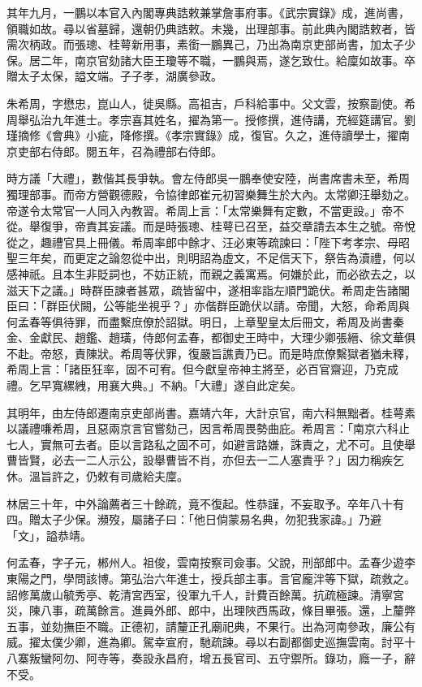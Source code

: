\begin{pinyinscope}
其年九月，一鵬以本官入內閣專典誥敕兼掌詹事府事。《武宗實錄》成，進尚書，領職如故。尋以省墓歸，還朝仍典誥敕。未幾，出理部事。前此典內閣誥敕者，皆需次柄政。而張璁、桂萼新用事，素銜一鵬異己，乃出為南京吏部尚書，加太子少保。居二年，南京官劾諸大臣王瓊等不職，一鵬與焉，遂乞致仕。給廩如故事。卒贈太子太保，謚文端。子子孝，湖廣參政。

朱希周，字懋忠，崑山人，徙吳縣。高祖吉，戶科給事中。父文雲，按察副使。希周舉弘治九年進士。孝宗喜其姓名，擢為第一。授修撰，進侍講，充經筵講官。劉瑾摘修《會典》小疵，降修撰。《孝宗實錄》成，復官。久之，進侍讀學士，擢南京吏部右侍郎。閱五年，召為禮部右侍郎。

時方議「大禮」，數偕其長爭執。會左侍郎吳一鵬奉使安陸，尚書席書未至，希周獨理部事。而帝方營觀德殿，令協律郎崔元初習樂舞生於大內。太常卿汪舉劾之。帝遂令太常官一人同入內教習。希周上言：「太常樂舞有定數，不當更設。」帝不從。舉復爭，帝責其妄議。而是時張璁、桂萼已召至，益交章請去本生之號。帝悅從之，趣禮官具上冊儀。希周率郎中餘才、汪必東等疏諫曰：「陛下考孝宗、母昭聖三年矣，而更定之論忽從中出，則明詔為虛文，不足信天下，祭告為瀆禮，何以感神祇。且本生非貶詞也，不妨正統，而親之義寓焉。何嫌於此，而必欲去之，以滋天下之議。」時群臣諫者甚眾，疏皆留中，遂相率詣左順門跪伏。希周走告諸閣臣曰：「群臣伏闕，公等能坐視乎？」亦偕群臣跪伏以請。帝聞，大怒，命希周與何孟春等俱待罪，而盡繫庶僚於詔獄。明日，上章聖皇太后冊文，希周及尚書秦金、金獻民、趙鑑、趙璜，侍郎何孟春，都御史王時中，大理少卿張縉、徐文華俱不赴。帝怒，責陳狀。希周等伏罪，復嚴旨譙責乃已。而是時庶僚繫獄者猶未釋，希周上言：「諸臣狂率，固不可宥。但今獻皇帝神主將至，必百官齋迎，乃克成禮。乞早寬縲絏，用襄大典。」不納。「大禮」遂自此定矣。

其明年，由左侍郎遷南京吏部尚書。嘉靖六年，大計京官，南六科無黜者。桂萼素以議禮嗛希周，且惡兩京言官嘗劾己，因言希周畏勢曲庇。希周言：「南京六科止七人，實無可去者。臣以言路私之固不可，如避言路嫌，誅責之，尤不可。且使舉曹皆賢，必去一二人示公，設舉曹皆不肖，亦但去一二人塞責乎？」因力稱疾乞休。溫旨許之，仍敕有司歲給夫廩。

林居三十年，中外論薦者三十餘疏，竟不復起。性恭謹，不妄取予。卒年八十有四。贈太子少保。瀕歿，屬諸子曰：「他日倘蒙易名典，勿犯我家諱。」乃避「文」，謚恭靖。

何孟春，字子元，郴州人。祖俊，雲南按察司僉事。父說，刑部郎中。孟春少遊李東陽之門，學問該博。第弘治六年進士，授兵部主事。言官龐泮等下獄，疏救之。詔修萬歲山毓秀亭、乾清宮西室，役軍九千人，計費百餘萬。抗疏極諫。清寧宮災，陳八事，疏萬餘言。進員外郎、郎中，出理陜西馬政，條目畢張。還，上釐弊五事，並劾撫臣不職。正德初，請釐正孔廟祀典，不果行。出為河南參政，廉公有威。擢太僕少卿，進為卿。駕幸宣府，馳疏諫。尋以右副都御史巡撫雲南。討平十八寨叛蠻阿勿、阿寺等，奏設永昌府，增五長官司、五守禦所。錄功，廕一子，辭不受。


\end{pinyinscope}
